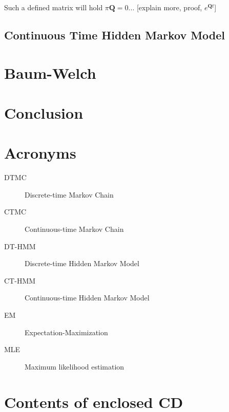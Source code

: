 \documentclass[thesis=M,english]{FITthesis}[2012/10/20]
\newcommand{\matr}[1]{\mathbf{#1}}
\begin{document}
Such a defined matrix will hold $\pi\matr{Q} = 0$... [explain more, proof, $e^{\matr{Q}t}$]


\section{Continuous Time Hidden Markov Model}



\chapter{Baum-Welch}



\chapter{Conclusion}





\appendix

\chapter{Acronyms}
\begin{description}
	\item[DTMC] Discrete-time Markov Chain	
	\item[CTMC] Continuous-time Markov Chain
	\item[DT-HMM] Discrete-time Hidden Markov Model
	\item[CT-HMM] Continuous-time Hidden Markov Model
	\item[EM] Expectation-Maximization 
	\item[MLE] Maximum likelihood estimation
\end{description}


\chapter{Contents of enclosed CD}


\begin{figure}
\end{figure}
\end{document}
